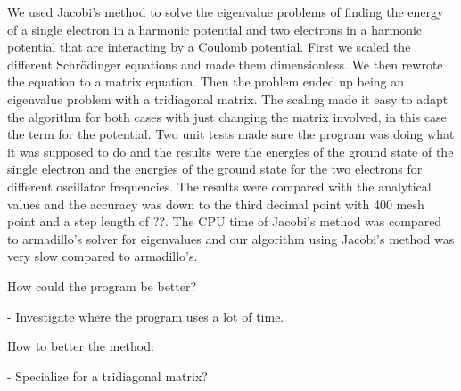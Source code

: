 We used Jacobi's method to solve the eigenvalue problems of finding the energy of a single electron in a harmonic potential and two electrons in a harmonic potential that are interacting by a Coulomb potential. First we scaled the different Schrödinger equations and made them dimensionless. We then rewrote the equation to a matrix equation. Then the problem ended up being an eigenvalue problem with a tridiagonal matrix. The scaling made it easy to adapt the algorithm for both cases  with just changing the matrix involved, in this case the term for the potential. Two unit tests made sure the program was doing what it was supposed to do and the results were the energies of the ground state of the single electron and the energies of the ground state for the two electrons for different oscillator frequencies. The results were compared with the analytical values and the accuracy was down to the third decimal point with 400 mesh point and a step length of ??. The CPU time of Jacobi's method was compared to armadillo's solver for eigenvalues and our algorithm using Jacobi's method was very slow compared to armadillo's. 

How could the program be better?

- Investigate where the program uses a lot of time.

How to better the method:

- Specialize for a tridiagonal matrix?



